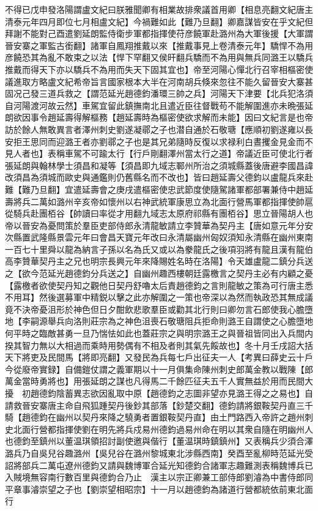 不得已戊申發洛陽謂盧文紀曰朕雅聞卿有相業故排衆議首用卿【相息亮翻文紀唐主清泰元年四月即位七月相盧文紀】今禍難如此【難乃旦翻】卿嘉謀皆安在乎文紀但拜謝不能對己酉遣劉延朗監侍衛步軍都指揮使苻彦饒軍赴潞州為大軍後援【大軍謂晉安寨之軍監古銜翻】諸軍自鳳翔推戴以來【推戴事見上卷清泰元年】驕悍不為用彦饒恐其為亂不敢束之以法【悍下罕翻又侯旰翻兵驕而不為用與無兵同潞王以驕兵推戴而得天下亦以驕兵不為用而失天下固其宜也】帝至河陽心憚北行召宰相樞密使議進取方略盧文紀希帝旨言國家根本大半在河南胡兵倏來忽往不能久留晉安大寨甚固况己發三道兵救之【謂范延光趙德鈞潘環三帥之兵】河陽天下津要【北兵犯洛須自河陽渡河故云然】車駕宜留此鎮撫南北且遣近臣往督戰苟不能解圍進亦未晩張延朗欲因事令趙延壽得解樞務【趙延壽時為樞密使欲求解而未能】因曰文紀言是也帝訪於餘人無敢異言者澤州刺史劉遂凝鄩之子也潜自通於石敬瑭【應順初劉遂雍以長安拒王思同而迎潞王者亦劉鄩之子也是其兄弟隨時反復以求禄利白晝攫金見金而不見人者也】表稱車駕不可踰太行【行戶剛翻澤州當太行之道】帝議近臣可使北行者張延朗與翰林學士須昌和凝等【須昌即九域志鄆州所治之須城縣蓋後唐避李國昌諱改須昌為須城而歐史與通鑑則仍舊縣名而不改也】皆曰趙延壽父德鈞以盧龍兵來赴難【難乃旦翻】宜遣延壽會之庚戌遣樞密使忠武節度使隨駕諸軍都部署兼侍中趙延壽將兵二萬如潞州辛亥帝如懷州以右神武統軍康思立為北面行營馬軍都指揮使帥扈從騎兵赴團栢谷【帥讀曰率從才用翻九域志太原府祁縣有團栢谷】思立晉陽胡人也帝以晉安為憂問策於羣臣吏部侍郎永清龍敏請立李贊華為契丹主【唐如意元年分安次縣置武隆縣景雲元年曰會昌天寶元年改曰永清屬幽州匈奴須知永清縣在幽州東南一百七十里舜以龍為納言子孫以名為氏又或以為豢龍氏之後項羽將有龍且漢有龍伯高李贊華契丹主之兄也明宗長興元年來降賜姓名時在洛陽】令天雄盧龍二鎮分兵送之【欲今范延光趙德鈞分兵送之】自幽州趣西樓朝廷露檄言之契丹主必有内顧之憂【露檄者欲使契丹知之觀他日契丹舒嚕太后責趙德鈞之言則龍敏之策為可行唐主悉不用耳】然後選募軍中精鋭以擊之此亦解圍之一策也帝深以為然而執政恐其無成議竟不決帝憂沮形於神色但日夕酣飲悲歌羣臣或勸其北行則曰卿勿言石郎使我心膽墮地【李嗣源舉兵向洛則莊宗為之神色沮喪石敬瑭阻兵拒命則潞王自謂使之心膽墮地何平時之臨敵甚勇一旦乃惴怯如此也蓋莊宗之與明宗潞王之與晉祖皆同出入兵間内揆其智力無以大相過而乘時用勢偶有不相及者則其氣先餒故也】冬十月壬戌詔大括天下將吏及民間馬【將即亮翻】又發民為兵每七戶出征夫一人【考異曰薛史云十戶今從廢帝實録】自備鎧仗謂之義軍期以十一月俱集命陳州刺史郎萬金教以戰陳【郎萬金當時勇將也】用張延朗之謀也凡得馬二千餘匹征夫五千人實無益於用而民間大擾　初趙德鈞陰蓄異志欲因亂取中原【趙德鈞之志圖非望亦見潞王得之之易也】自請救晉安寨唐主命自飛狐踵契丹後鈔其部落【鈔楚交翻】德鈞請將銀鞍契丹直三千騎【趙德鈞在幽州以契丹來降之驍勇者置銀鞍契丹直】由土門路西入帝許之趙州刺史北面行營都指揮使劉在明先將兵戍易州德鈞過易州命在明以其衆自隨在明幽州人也德鈞至鎮州以董温琪領招討副使邀與偕行【董温琪時鎮鎮州】又表稱兵少須合澤潞兵乃自吳兒谷趣潞州【吳兒谷在潞州黎城東北涉縣西南】癸酉至亂柳時范延光受詔將部兵二萬屯遼州德鈞又請與魏博軍合延光知德鈞合諸軍志趣難測表稱魏博兵已入賊境無容南行數百里與德鈞合乃止　漢主以宗正卿兼工部侍郎劉濬為中書侍郎同平章事濬崇望之子也【劉崇望相昭宗】十一月以趙德鈞為諸道行營都統依前東北面行


